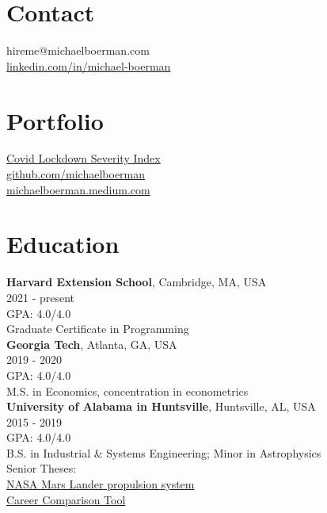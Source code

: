 \documentclass[margin,line]{res}
\begin{document}

\begin{resume}
\section{\sc Contact}
\vspace{.05in}
  {\ttfamily hireme@michaelboerman.com} \\
  \href{linkedin.com/in/michael-boerman}{\ttfamily linkedin.com/in/michael-boerman}\\

\section{\sc Portfolio}
\faBarChart \href{https://github.com/michaelboerman/lockdown_severity_index#readme}{Covid Lockdown Severity Index}\\
 \href{https://github.com/michaelboerman}{\ttfamily github.com/michaelboerman}\\ 
 \href{https://michaelboerman.medium.com/}{\ttfamily michaelboerman.medium.com}\\


\section{\sc Education}
{\bf Harvard Extension School}, Cambridge, MA, USA\\
2021 - present\\
GPA: 4.0/4.0\\
Graduate Certificate in Programming\\

{\bf Georgia Tech}, Atlanta, GA, USA\\
2019 - 2020\\
GPA: 4.0/4.0\\
M.S. in Economics, concentration in econometrics\\

{\bf University of Alabama in Huntsville}, Huntsville, AL, USA\\
2015 - 2019\\
GPA: 4.0/4.0\\
B.S. in Industrial \& Systems Engineering; Minor in Astrophysics\\
Senior Theses: \\
\hspace{5mm}{\it -- Systems Engineering:} \href{https://tinyurl.com/ISEEM-SD}{NASA Mars Lander propulsion system}\\
\hspace{5mm}{\it -- Economic Decision Analysis:} \href{http://tinyurl.com/BoermanCareerChoice
}{Career Comparison Tool}


\end{resume}
\end{document}
